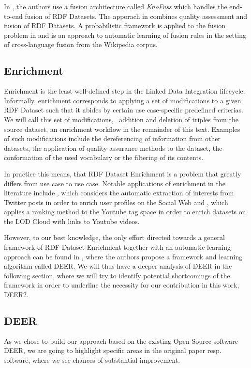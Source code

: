 In \cite{nikolov:2007a,nikolov:2008a,nikolov:2008b}, the authors use a fusion architecture called \emph{KnoFuss} which handles the end-to-end fusion of \ac{RDF} Datasets.
The apporach in \cite{mendes:2012a} combines quality assessment and fusion of \ac{RDF} Datasets.
A probabilistic framework is applied to the fusion problem in\cite{dong:2014a} and \cite{bryl:2014a} is an approach to automatic learning of fusion rules in the setting of cross-language fusion from the Wikipedia corpus.

\subsection{Enrichment}
\label{ssec:enrichment}

Enrichment is the least well-defined step in the Linked Data Integration lifecycle.
Informally, enrichment corresponds to applying a set of modifications to a given \ac{RDF} Dataset such that it abides by certain use case-specific predefined criterias.
We will call this set of modifications, \ie~addition and deletion of triples from the source dataset, an enrichment workflow in the remainder of this text.
Examples of such modifications include the dereferencing of information from other datasets, the application of quality assurance methods to the dataset, the conformation of the used vocabulary or the filtering of its contents.

In practice this means, that \ac{RDF} Dataset Enrichment is a problem that greatly differs from use case to use case. 
Notable applications of enrichment in the literature include \cite{abel:2011a}, which considers the automatic extraction of interests from Twitter posts in order to enrich user profiles on the Social Web and \cite{choudhury:2009a}, which applies a ranking method to the Youtube tag space in order to enrich datasets on the \ac{LOD} Cloud with links to Youtube videos.

However, to our best knowledge, the only effort directed towards a general framework of \ac{RDF} Dataset Enrichment together with an automatic learning approach can be found in \cite{sherif:2015a}, where the authors propose a framework and learning algorithm called \ac{DEER}.
We will thus have a deeper analysis of \ac{DEER} in the following section, where we will try to identify potential shortcomings of the framework in order to underline the necessity for our contribution in this work, \ac{DEER2}.

\subsection{DEER}
\label{ssec:deer}
As we chose to build our approach based on the existing Open Source software \ac{DEER}, we are going to highlight specific areas in the original paper resp.\, software, where we see chances of substantial improvement.

